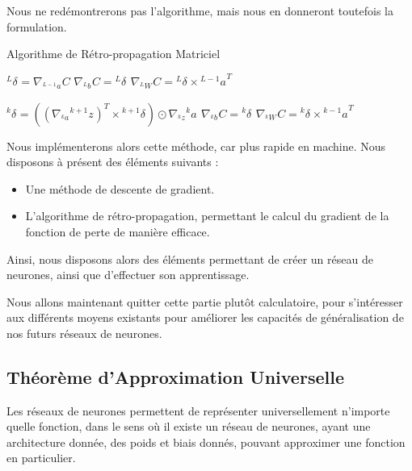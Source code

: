 \documentclass[a4paper, 11pt]{report}
\newcommand{\lexp}[1]{\phantom{}^{#1}}
\newcommand{\elem}[4]{\lexp{#2}#1^{#3}_{#4}}
\begin{document}
Nous ne redémontrerons pas l'algorithme, mais nous en donneront toutefois la formulation.
\begin{algorithm}[H]
	\caption{Algorithme de Rétro-propagation Matriciel}
	\begin{algorithmic}
		\STATE
		\STATE $\elem{\delta}{L}{}{} = \nabla_{\elem{a}{L-1}{}{}} C$
		\STATE $\nabla_{\elem{b}{L}{}{}} C = \elem{\delta}{L}{}{}$
		\STATE $\nabla_{\elem{W}{L}{}{}} C = \elem{\delta}{L}{}{} \times{\elem{a}{L-1}{}{}}^T $
					    
		\STATE
		\STATE $\elem{\delta}{k}{}{} = ((\nabla_{\elem{a}{k}{}{}}\elem{z}{k+1}{}{})^T \times \elem{\delta}{k+1}{}{}) \odot \nabla_{\elem{z}{k}{}{}}{\elem{a}{k}{}{}}$
		\STATE $\nabla_{\elem{b}{k}{}{}} C = \elem{\delta}{k}{}{}$
		\STATE $\nabla_{\elem{W}{k}{}{}} C = \elem{\delta}{k}{}{} \times{\elem{a}{k-1}{}{}}^T $
		\ENDFOR
	\end{algorithmic}
\end{algorithm}
Nous implémenterons alors cette méthode, car plus rapide en machine.
Nous disposons à présent des éléments suivants :
\begin{itemize}
	\item Une méthode de descente de gradient.
	\item L'algorithme de rétro-propagation, permettant le calcul du gradient de la fonction de perte de manière efficace.
\end{itemize}
Ainsi, nous disposons alors des éléments permettant de créer un réseau de neurones, ainsi que d'effectuer son apprentissage.

Nous allons maintenant quitter cette partie plutôt calculatoire, pour s'intéresser aux différents moyens existants pour améliorer les capacités de généralisation de nos futurs réseaux de neurones.
\subsection{Théorème d'Approximation Universelle}
Les réseaux de neurones permettent de représenter universellement n'importe quelle fonction, dans le sens où il existe un réseau de neurones, ayant une architecture donnée, des poids et biais donnés, pouvant approximer une fonction en particulier.
\end{document}
